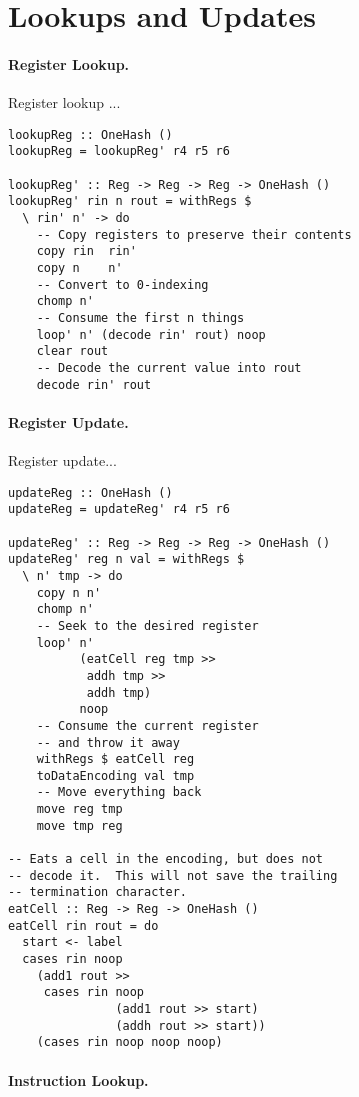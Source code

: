 \documentclass[10pt, preprint, nocopyrightspace]{sigplanconf}
\begin{document}
\section{Lookups and Updates}

\paragraph{Register Lookup.}

Register lookup ...

\begin{lstlisting}
lookupReg :: OneHash ()
lookupReg = lookupReg' r4 r5 r6

lookupReg' :: Reg -> Reg -> Reg -> OneHash ()
lookupReg' rin n rout = withRegs $
  \ rin' n' -> do
    -- Copy registers to preserve their contents
    copy rin  rin'
    copy n    n'
    -- Convert to 0-indexing
    chomp n'
    -- Consume the first n things
    loop' n' (decode rin' rout) noop
    clear rout
    -- Decode the current value into rout
    decode rin' rout
\end{lstlisting}

\paragraph{Register Update.}

Register update...

\begin{lstlisting}
updateReg :: OneHash ()
updateReg = updateReg' r4 r5 r6

updateReg' :: Reg -> Reg -> Reg -> OneHash ()
updateReg' reg n val = withRegs $
  \ n' tmp -> do
    copy n n'
    chomp n'
    -- Seek to the desired register
    loop' n'
          (eatCell reg tmp >>
           addh tmp >>
           addh tmp)
          noop
    -- Consume the current register
    -- and throw it away
    withRegs $ eatCell reg
    toDataEncoding val tmp
    -- Move everything back
    move reg tmp
    move tmp reg

-- Eats a cell in the encoding, but does not
-- decode it.  This will not save the trailing
-- termination character.
eatCell :: Reg -> Reg -> OneHash ()
eatCell rin rout = do
  start <- label
  cases rin noop
    (add1 rout >>
     cases rin noop
               (add1 rout >> start)
               (addh rout >> start))
    (cases rin noop noop noop)
\end{lstlisting}

\paragraph{Instruction Lookup.}
\end{document}
